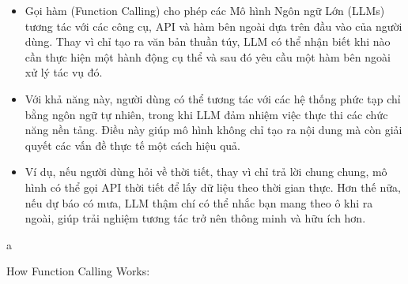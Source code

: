 \documentclass[final,letterpaper,twoside,12pt]{report}
\begin{document}
\begin{itemize}
	\item Gọi hàm (Function Calling) cho phép các Mô hình Ngôn ngữ Lớn (LLMs) tương tác với các công cụ, API và hàm bên ngoài dựa trên đầu vào của người dùng. Thay vì chỉ tạo ra văn bản thuần túy, LLM có thể nhận biết khi nào cần thực hiện một hành động cụ thể và sau đó yêu cầu một hàm bên ngoài xử lý tác vụ đó.

	\item Với khả năng này, người dùng có thể tương tác với các hệ thống phức tạp chỉ bằng ngôn ngữ tự nhiên, trong khi LLM đảm nhiệm việc thực thi các chức năng nền tảng. Điều này giúp mô hình không chỉ tạo ra nội dung mà còn giải quyết các vấn đề thực tế một cách hiệu quả.

	\item Ví dụ, nếu người dùng hỏi về thời tiết, thay vì chỉ trả lời chung chung, mô hình có thể gọi API thời tiết để lấy dữ liệu theo thời gian thực. Hơn thế nữa, nếu dự báo có mưa, LLM thậm chí có thể nhắc bạn mang theo ô khi ra ngoài, giúp trải nghiệm tương tác trở nên thông minh và hữu ích hơn.
\end{itemize}a

\newpage

How Function Calling Works:
\end{document}
